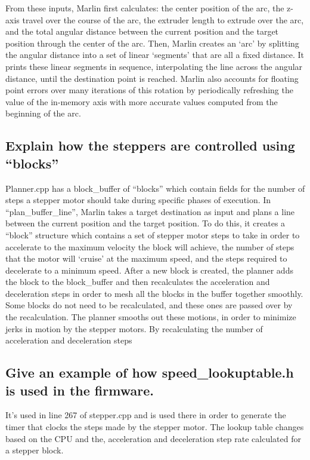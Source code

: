 \documentclass[letter]{article}
\begin{document}
From these inputs, Marlin first calculates: the center position of the arc, the z-axis travel over the course of the arc, the extruder length to extrude over the arc, and the total angular distance between the current position and the target position through the center of the arc. Then, Marlin creates an ‘arc’ by splitting the angular distance into a set of linear ‘segments’ that are all a fixed distance. It prints these linear segments in sequence, interpolating the line across the angular distance, until the destination point is reached. Marlin also accounts for floating point errors over many iterations of this rotation by periodically refreshing the value of the in-memory axis with more accurate values computed from the beginning of the arc. 

\subsection{Explain how the steppers are controlled using “blocks”}
Planner.cpp has a block\_buffer of “blocks” which contain fields for the number of steps a stepper motor should take during specific phases of execution. In “plan\_buffer\_line”, Marlin takes a target destination as input and plans a line between the current position and the target position. To do this, it creates a “block” structure which contains a set of stepper motor steps to take in order to accelerate to the maximum velocity the block will achieve, the number of steps that the motor will ‘cruise’ at the maximum speed, and the steps required to decelerate to a minimum speed. 
After a new block is created, the planner adds the block to the block\_buffer and then recalculates the acceleration and deceleration steps in order to mesh all the blocks in the buffer together smoothly. Some blocks do not need to be recalculated, and these ones are passed over by the recalculation. 
The planner smooths out these motions, in order to minimize jerks in motion by the stepper motors. By recalculating the number of acceleration and deceleration steps

\subsection{Give an example of how speed\_lookuptable.h is used in the firmware.}
It’s used in line 267 of stepper.cpp and is used there in order to generate the timer that clocks the steps made by the stepper motor. The lookup table changes based on the CPU and the, acceleration and deceleration step rate calculated for a stepper block. 
\end{document}
